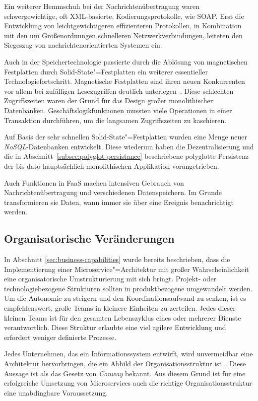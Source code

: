 Ein weiterer Hemmschuh bei der Nachrichtenübertragung waren schwergewichtige, oft XML-basierte, Kodierungsprotokolle, wie \zB SOAP. Erst die Entwicklung von leichtgewichtigeren \bzw effizienteren Protokollen, in Kombination mit den um Größenordnungen schnelleren Netzwerkverbindungen, leiteten den Siegeszug von nachrichtenorientierten Systemen ein.

Auch in der Speichertechnologie passierte durch die Ablösung von magnetischen Festplatten durch Solid-State"=Festplatten ein weiterer essentieller Technologiefortschritt. Magnetische Festplatten sind ihren neuen Konkurrenten vor allem bei zufälligen Lesezugriffen deutlich unterlegen~\cite{Regola:2012:CMV:2379436.2379437}. Diese schlechten Zugriffszeiten waren der Grund für das Design großer monolithischer Datenbanken. Geschäftslogikfunktionen mussten viele Operationen in einer Transaktion durchführen, um die langsamen Zugriffszeiten zu kaschieren.

Auf Basis der sehr schnellen Solid-State"=Festplatten wurden eine Menge neuer \textit{NoSQL}-Datenbanken entwickelt. Diese wiederum haben die Dezentralisierung und die in Abschnitt~\ref{subsec:polyglot-persistance} beschriebene polyglotte Persistenz der bis dato hauptsächlich monolithischen Applikation vorangetrieben.

Auch Funktionen in FaaS machen intensiven Gebrauch von Nachrichtenübertragung und verschiedenen Datenspeichern. Im Grunde transformieren sie Daten, wann immer sie über eine Ereignis benachrichtigt werden.

\subsection{Organisatorische Veränderungen}

In Abschnitt \ref{sec:business-capabilities} wurde bereits beschrieben, dass die Implementierung einer Microservice"=Architektur mit großer Wahrscheinlichkeit eine organisatorische Umstrukturierung mit sich bringt. Projekt- oder technologiebezogene Strukturen sollten in produktbezogene umgewandelt werden. Um die Autonomie zu steigern und den Koordinationsaufwand zu senken, ist es empfehlenswert, große Teams in kleinere Einheiten zu zerteilen. Jedes dieser kleinen Teams ist für den gesamten Lebenszyklus eines oder mehrerer Dienste verantwortlich. Diese Struktur erlaubte eine viel agilere Entwicklung und erfordert weniger definierte Prozesse.

Jedes Unternehmen, das ein Informationssystem entwirft, wird unvermeidbar eine Architektur hervorbringen, die ein Abbild der Organisationsstruktur ist~\cite{paper:conway:1968}. Diese Aussage ist als das Gesetz von \textit{Conway} bekannt. Aus diesem Grund ist für eine erfolgreiche Umsetzung von Microservices auch die richtige Organisationsstruktur eine unabdingbare Voraussetzung.

